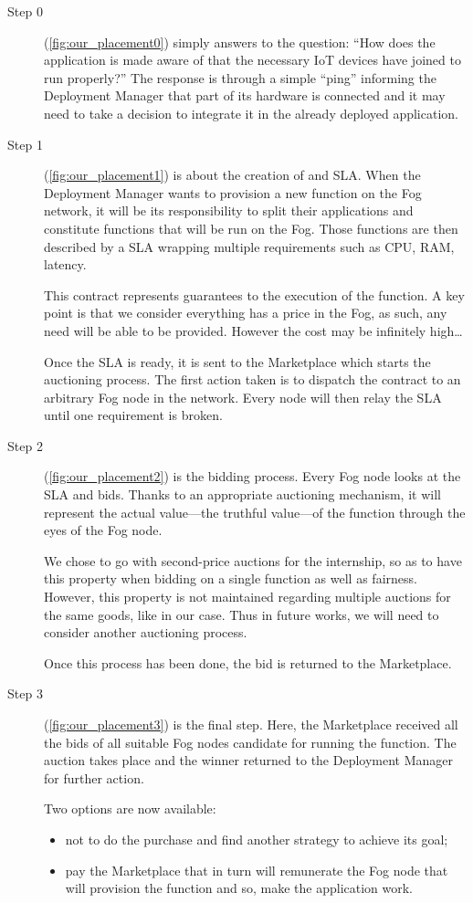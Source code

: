 \begin{description}
	\item[Step 0]{(\cref{fig:our_placement0}) simply answers to the question: “How does the application is made aware of that the necessary \gls{IoT} devices have joined to run properly?”
	            The response is through a simple “ping” informing the Deployment Manager that part of its hardware is connected and it may need to take a decision to integrate it in the already deployed application.
	      }
	\item[Step 1]{(\cref{fig:our_placement1}) is about the creation of and \gls{SLA}. When the Deployment Manager wants to provision a new function on the Fog network, it will be its responsibility to split their applications and constitute functions that will be run on the Fog. Those functions are then described by a \gls{SLA} wrapping multiple requirements such as CPU, RAM, latency.

	            This contract represents guarantees to the execution of the function. A key point is that we consider everything has a price in the Fog, as such, any need will be able to be provided. However the cost may be infinitely high…

	            Once the \gls{SLA} is ready, it is sent to the Marketplace which starts the auctioning process. The first action taken is to dispatch the contract to an arbitrary Fog node in the network. Every node will then relay the \gls{SLA} until one requirement is broken.
	      }
	\item[Step 2]{(\cref{fig:our_placement2}) is the bidding process. Every Fog node looks at the \gls{SLA} and bids. Thanks to an appropriate auctioning mechanism, it will represent the actual value—the truthful value—of the function through the eyes of the Fog node.

	            We chose to go with second-price auctions for the internship, so as to have this property when bidding on a single function as well as fairness. However, this property is not maintained regarding multiple auctions for the same goods, like in our case. Thus in future works, we will need to consider another auctioning process.

	            Once this process has been done, the bid is returned to the Marketplace.}
	\item[Step 3]{(\cref{fig:our_placement3}) is the final step. Here, the Marketplace received all the bids of all suitable Fog nodes candidate for running the function. The auction takes place and the winner returned to the Deployment Manager for further action.

	            Two options are now available:
	            \begin{itemize}
		            \item not to do the purchase and find another strategy to achieve its goal;
		            \item pay the Marketplace that in turn will remunerate the Fog node that will provision the function and so, make the application work.
	            \end{itemize}}
\end{description}


